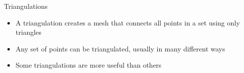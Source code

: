 \begin{frame}{Triangulations}
	\begin{itemize}
		\item A triangulation creates a mesh that connects all points in a set using only triangles
		\item Any set of points can be triangulated, usually in many different ways
		\item Some triangulations are more useful than others
	\end{itemize}
	
\end{frame}
